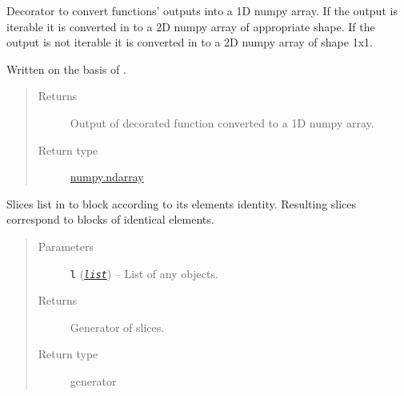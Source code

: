 \documentclass[a4paper,10pt,english]{sphinxmanual}
\begin{document}

\begin{fulllineitems}
\label{aqueduct.utils.helpers:aqueduct.utils.helpers.arrayify1}
Decorator to convert functions' outputs into a 1D numpy array. If the output is iterable it is converted in to a 2D numpy array
of appropriate shape. If the output is not iterable it is converted in to a 2D numpy array of shape 1x1.

Written on the basis of {\hyperref[aqueduct.utils.helpers:aqueduct.utils.helpers.listify]{}}.
\begin{quote}\begin{description}
\item[{Returns}] \leavevmode
Output of decorated function converted to a 1D numpy array.

\item[{Return type}] \leavevmode
\href{http://docs.scipy.org/doc/numpy/reference/generated/numpy.ndarray.html\#numpy.ndarray}{numpy.ndarray}

\end{description}\end{quote}

\end{fulllineitems}


\begin{fulllineitems}
\label{aqueduct.utils.helpers:aqueduct.utils.helpers.list_blocks_to_slices}
Slices list in to block according to its elements identity. Resulting slices correspond to blocks of
identical elements.
\begin{quote}\begin{description}
\item[{Parameters}] \leavevmode
\textbf{\texttt{l}} (\href{https://docs.python.org/2/library/functions.html\#list}{\emph{\texttt{list}}}) -- List of any objects.

\item[{Returns}] \leavevmode
Generator of slices.

\item[{Return type}] \leavevmode
generator

\end{description}\end{quote}

\end{fulllineitems}
\end{document}
